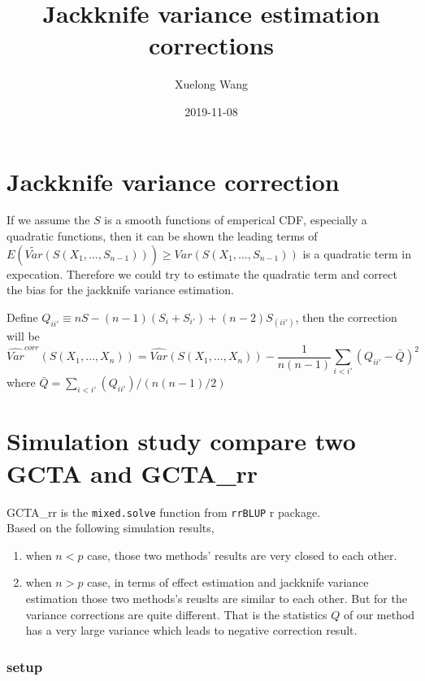 \documentclass[]{article}
\title{Jackknife variance estimation corrections}
\author{Xuelong Wang}
\date{2019-11-08}
\providecommand{\tightlist}{%
  \setlength{\itemsep}{0pt}\setlength{\parskip}{0pt}}
\begin{document}
\maketitle

{
\setcounter{tocdepth}{2}
\tableofcontents
}
\section{Jackknife variance
correction}\label{jackknife-variance-correction}

If we assume the \(S\) is a smooth functions of emperical CDF,
especially a quadratic functions, then it can be shown the leading terms
of
\(E(\tilde{Var}(S(X_1, \dots, S_{n-1}))) \geq Var(S(X_1, \dots, S_{n-1}))\)
is a quadratic term in expecation. Therefore we could try to estimate
the quadratic term and correct the bias for the jackknife variance
estimation.

Define \(Q_{ii'} \equiv nS - (n-1)(S_{i} + S_{i'}) + (n-2)S_{(ii')}\),
then the correction will be \[
\hat{Var}^{corr}(S(X_1, \dots, X_n)) = \hat{Var}(S(X_1, \dots, X_n)) - \frac{1}{n(n-1)}\sum_{i < i'}(Q_{ii'}- \bar{Q})^2
\] where \(\bar{Q} = \sum_{i < i'}(Q_{ii'})/(n(n-1)/2)\)

\section{Simulation study compare two GCTA and
GCTA\_rr}\label{simulation-study-compare-two-gcta-and-gcta_rr}

GCTA\_rr is the \texttt{mixed.solve} function from \texttt{rrBLUP} r
package.\\
Based on the following simulation results,

\begin{enumerate}
\def\labelenumi{\arabic{enumi}.}
\tightlist
\item
  when \(n<p\) case, those two methods' results are very closed to each
  other.
\item
  when \(n>p\) case, in terms of effect estimation and jackknife
  variance estimation those two methods's reuslts are similar to each
  other. But for the variance corrections are quite different. That is
  the statistics \(Q\) of our method has a very large variance which
  leads to negative correction result.
\end{enumerate}

\subsubsection{setup}\label{setup}
\end{document}
